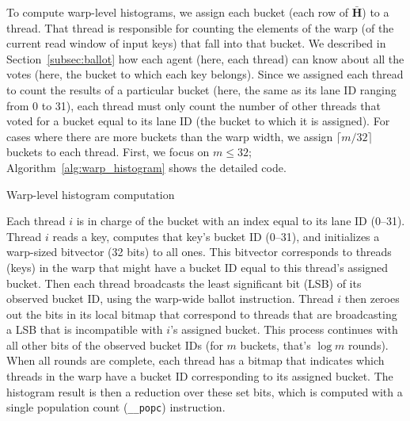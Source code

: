 To compute warp-level histograms, we assign each bucket (each row of $\bar{\mathbf{H}}$) to a thread. That thread is responsible for counting the elements of the warp (of the current read window of input keys) that fall into that bucket.
We described in Section~\ref{subsec:ballot} how each agent (here, each thread) can know about all the votes (here, the bucket to which each key belongs).
Since we assigned each thread to count the results of a particular bucket (here, the same as its lane ID ranging from 0 to 31), each thread must only count the number of other threads that voted for a bucket equal to its lane ID (the bucket to which it is assigned).
For cases where there are more buckets than the warp width, we assign $\lceil m/32 \rceil$ buckets to each thread.
First, we focus on $m\leq 32$; Algorithm~\ref{alg:warp_histogram} shows the detailed code.

\begin{algorithm}
\DontPrintSemicolon
\caption{Warp-level histogram computation}\label{alg:warp_histogram}
\end{algorithm}

Each thread $i$ is in charge of the bucket with an index equal to its lane ID (0--31). Thread $i$ reads a key, computes that key's bucket ID (0--31), and initializes a warp-sized bitvector (32 bits) to all ones. This bitvector  corresponds to threads (keys) in the warp that might have a bucket ID equal to this thread's assigned bucket. Then each thread broadcasts the least significant bit (LSB) of its observed bucket ID, using the warp-wide ballot instruction. Thread $i$ then zeroes out the bits in its local bitmap that correspond to threads that are broadcasting a LSB that is incompatible with $i$'s assigned bucket. This process continues with all other bits of the observed bucket IDs (for $m$ buckets, that's $\log m$ rounds). When all rounds are complete, each thread has a bitmap that indicates which threads in the warp have a bucket ID corresponding to its assigned bucket. The histogram result is then a reduction over these set bits, which is computed with a single population count (\texttt{\_\_popc}) instruction.

